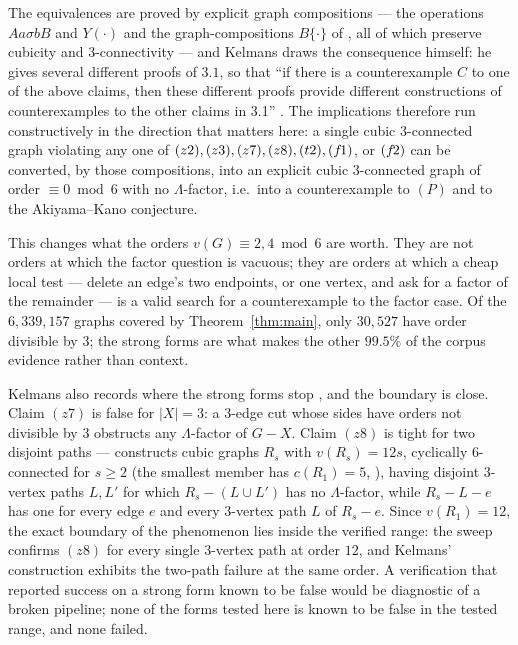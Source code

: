 \documentclass[11pt]{amsart}
\newcommand{\Lam}{\Lambda}
\newcommand{\vv}{v}
\theoremstyle{plain}
\theoremstyle{definition}
\theoremstyle{remark}
\begin{document}
The equivalences are proved by explicit graph compositions --- the
operations $A a\sigma b B$ and $Y(\cdot)$ and the graph-compositions
$B\{\cdot\}$ of \cite[\S2]{Kel11}, all of which preserve cubicity and
$3$-connectivity \cite[2.1--2.3]{Kel11} --- and Kelmans draws the
consequence himself: he gives several different proofs of $3.1$, so that
``if there is a counterexample $C$ to one of the above claims, then these
different proofs provide different constructions of counterexamples to
the other claims in 3.1'' \cite[\S1]{Kel11}. The implications therefore
run constructively in the direction that matters here: a single cubic
$3$-connected graph violating any one of $(z2),(z3),(z7),(z8),(t2),(f\mkern-2mu1)$,
or $(f\mkern-2mu2)$ can be converted, by those compositions, into an explicit cubic
$3$-connected graph of order $\equiv 0 \bmod 6$ with no $\Lam$-factor,
i.e.\ into a counterexample to $(P)$ and to the Akiyama--Kano conjecture.

This changes what the orders $\vv(G)\equiv 2,4 \bmod 6$ are worth. They
are not orders at which the factor question is vacuous; they are orders
at which a cheap local test --- delete an edge's two endpoints, or one
vertex, and ask for a factor of the remainder --- is a valid search for a
counterexample to the factor case. Of the $6{,}339{,}157$ graphs covered
by Theorem~\ref{thm:main}, only $30{,}527$ have order divisible by $3$;
the strong forms are what makes the other $99.5\%$ of the corpus
evidence rather than context.

Kelmans also records where the strong forms stop \cite[(r1)--(r8)]{Kel11},
and the boundary is close. Claim $(z7)$ is false for $|X|=3$: a $3$-edge
cut whose sides have orders not divisible by $3$ obstructs any
$\Lam$-factor of $G-X$. Claim $(z8)$ is tight for two disjoint paths ---
\cite[6.1]{Kel11} constructs cubic graphs $R_s$ with $\vv(R_s)=12s$,
cyclically $6$-connected for $s\ge2$ (the smallest member has
$c(R_1)=5$, \cite[6.1(a2)]{Kel11}), having disjoint $3$-vertex paths
$L,L'$ for which $R_s-(L\cup L')$ has no $\Lam$-factor, while $R_s-L-e$
has one for every edge $e$ and every $3$-vertex path $L$ of $R_s-e$.
Since $\vv(R_1)=12$, the exact boundary of the phenomenon lies inside the
verified range: the sweep confirms $(z8)$ for every single $3$-vertex
path at order $12$, and Kelmans' construction exhibits the two-path
failure at the same order. A verification that reported success on a strong form known to be
false would be diagnostic of a broken pipeline; none of the forms tested
here is known to be false in the tested range, and none failed.
\end{document}
